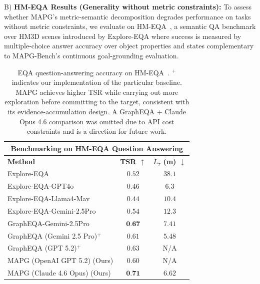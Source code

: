 \noindent B) \textbf{HM-EQA Results (Generality without metric constraints):} 
To assess whether MAPG's metric-semantic decomposition degrades performance on tasks without metric constraints, we evaluate on HM-EQA~\cite{ren2024exploreconfidentefficientexploration}, a semantic QA benchmark over HM3D scenes introduced by Explore-EQA where success is measured by multiple-choice answer accuracy over object properties and states complementary to MAPG-Bench's continuous goal-grounding evaluation. 

\begin{table}[t]
\centering
\footnotesize
\setlength{\tabcolsep}{5pt}
\renewcommand{\arraystretch}{1.03}

\begin{tabular}{p{4.8cm}cc}
\toprule
\multicolumn{3}{c}{\textbf{Benchmarking on HM-EQA Question Answering}} \\
\midrule
\textbf{Method} & \textbf{TSR $\uparrow$} & \textbf{$L_{\tau}$ (\si{\m}) $\downarrow$} \\
\midrule

Explore-EQA & $0.52$ & $38.1$ \\
Explore-EQA-GPT4o & $0.46$ & $6.3$ \\
Explore-EQA-Llama4-Mav & $0.44$ & $10.4$ \\
Explore-EQA-Gemini-2.5Pro & $0.54$ & $12.3$ \\
GraphEQA-Gemini-2.5Pro & $\textbf{0.67}$ & $7.41$ \\
GraphEQA (Gemini 2.5 Pro)$^{+}$ & $0.61$ & $5.48$ \\
GraphEQA (GPT 5.2)$^{+}$ & $0.63$ & N/A \\
MAPG (OpenAI GPT 5.2) (Ours) & $0.60$ & N/A \\
MAPG (Claude 4.6 Opus) (Ours) & $\textbf{0.71}$ & $6.62$ \\
\bottomrule
\end{tabular}
\caption{EQA question-answering accuracy on HM-EQA~\cite{ren2024exploreconfidentefficientexploration}. $^{+}$ indicates our implementation of the particular baseline. MAPG achieves higher TSR while carrying out more exploration before committing to the target, consistent with its evidence-accumulation design. A GraphEQA + Claude Opus 4.6 comparison was omitted due to API cost constraints and is a direction for future work. %
}
\label{tab:eqa_qa_accuracy}
\end{table}

